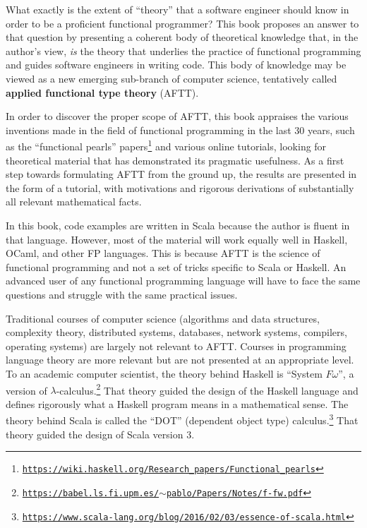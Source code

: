 

What exactly is the extent of \textsf{``}theory\textsf{''} that a software engineer
should know in order to be a proficient functional programmer? This
book proposes an answer to that question by presenting a coherent
body of theoretical knowledge that, in the author\textsf{'}s view, \emph{is}
the theory that underlies the practice of functional programming and
guides software engineers in writing code. This body of knowledge
may be viewed as a new emerging sub-branch of computer science, tentatively
called \textbf{applied functional
type theory} (AFTT). 

In order to discover the proper scope of AFTT, this book appraises
the various inventions made in the field of functional programming
in the last 30 years, such as the \textquotedblleft functional pearls\textquotedblright{}
papers\footnote{\texttt{\href{https://wiki.haskell.org/Research_papers/Functional_pearls}{https://wiki.haskell.org/Research\_papers/Functional\_pearls}}}
and various online tutorials, looking for theoretical material that
has demonstrated its pragmatic usefulness. As a first step towards
formulating AFTT from the ground up, the results are presented in
the form of a tutorial, with motivations and rigorous derivations
of substantially all relevant mathematical facts.

In this book, code examples are written in Scala because the author
is fluent in that language. However, most of the material will work
equally well in Haskell, OCaml, and other FP languages. This is because
AFTT is the science of functional programming and not a set of tricks
specific to Scala or Haskell. An advanced user of any functional programming
language will have to face the same questions and struggle with the
same practical issues.


Traditional courses of computer science (algorithms and data structures,
complexity theory, distributed systems, databases, network systems,
compilers, operating systems) are largely not relevant to AFTT. Courses
in programming language theory are more relevant but are not presented
at an appropriate level. To an academic computer scientist, the theory
behind Haskell is \textsf{``}System $F\omega$\textsf{''}, a version of $\lambda$-calculus.\footnote{\texttt{\href{https://babel.ls.fi.upm.es/~pablo/Papers/Notes/f-fw.pdf}{https://babel.ls.fi.upm.es/$\sim$pablo/Papers/Notes/f-fw.pdf}}}
That theory guided the design of the Haskell language and defines
rigorously what a Haskell program means in a mathematical sense. The
theory behind Scala is called the \textsf{``}DOT\textsf{''} (dependent object type)
calculus.\footnote{\texttt{\href{https://www.scala-lang.org/blog/2016/02/03/essence-of-scala.html}{https://www.scala-lang.org/blog/2016/02/03/essence-of-scala.html}}}
That theory guided the design of Scala version 3.

